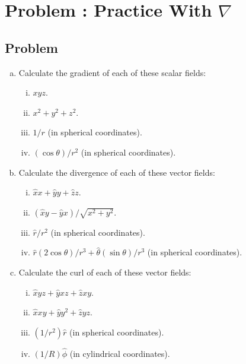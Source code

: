 \documentclass[solutions]{esg8022pset}
\date{\today }
\begin{document}
\section{Problem \thesection: Practice With \texorpdfstring {$\nabla $}{∇}}
\subsection{Problem}
  \begin{enumerate}[(a)]
    \item Calculate the gradient of each of these scalar fields:
      \begin{enumerate}[(i)]
        \item $xyz$.
        \item $x^2 + y^2 + z^2$.
        \item $1/r$ (in spherical coordinates).
        \item $(\cos\theta) / r^2$ (in spherical coordinates).
      \end{enumerate}
    \item Calculate the divergence of each of these vector fields:
      \begin{enumerate}[(i)]
        \item $\hat{x} x + \hat{y} y + \hat{z} z$.
        \item $(\hat{x} y - \hat{y} x) / \sqrt{x^2 + y^2}$.
        \item $\hat{r}/r^2$ (in spherical coordinates).
        \item $\hat{r}(2\cos\theta)/r^3 + \hat{\theta}(\sin\theta)/r^3$ (in spherical coordinates).
      \end{enumerate}
    \item Calculate the curl of each of these vector fields:
      \begin{enumerate}[(i)]
        \item $\hat{x} yz + \hat{y} xz + \hat{z} xy$.
        \item $\hat{x} xy + \hat{y} y^2 + \hat{z} yz$.
        \item $(1/r^2)\hat{r}$ (in spherical coordinates).
        \item $(1/R)\hat{\phi}$ (in cylindrical coordinates).
      \end{enumerate}
  \end{enumerate}
\end{document}
